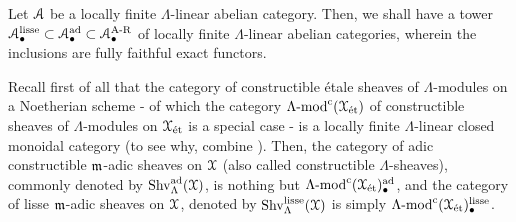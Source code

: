             \begin{proposition} \label{prop: adic_categories_are_linear_and_abelian}
                Let $\mathcal{A}$ be a locally finite $\Lambda$-linear abelian category. Then, we shall have a tower $\mathcal{A}_{\bullet}^{\mathrm{lisse}} \subset \mathcal{A}_{\bullet}^{\mathrm{ad}} \subset \mathcal{A}_{\bullet}^{\mathrm{A\text{-}R}}$ of locally finite $\Lambda$-linear abelian categories, wherein the inclusions are fully faithful exact functors.
            \end{proposition}
            \begin{example} \label{example: adic_sheaves}
                Recall first of all that the category of constructible \'etale sheaves of $\Lambda$-modules on a Noetherian scheme - of which the category $\Lambda\text{-}\mathrm{mod}^{\mathrm{c}}(\mathcal{X}_{\mathrm{\acute{e}t}})$ of constructible sheaves of $\Lambda$-modules on $\mathcal{X}_{\mathrm{\acute{e}t}}$ is a special case - is a locally finite $\Lambda$-linear closed monoidal category (to see why, combine \cite[Propositions 3.20 and 3.22]{behrend_l_adic_sheaves_for_algebraic_stacks}). Then, the category of adic constructible $\mathfrak{m}$-adic sheaves on $\mathcal{X}$ (also called constructible $\Lambda$-sheaves), commonly denoted by $\mathrm{Shv}_{\Lambda}^{\mathrm{ad}}(\mathcal{X})$, is nothing but $\Lambda\text{-}\mathrm{mod}^{\mathrm{c}}(\mathcal{X}_{\mathrm{\acute{e}t}})_{\bullet}^{\mathrm{ad}}$, and the category of lisse $\mathfrak{m}$-adic sheaves on $\mathcal{X}$, denoted by $\mathrm{Shv}_{\Lambda}^{\mathrm{lisse}}(\mathcal{X})$ is simply $\Lambda\text{-}\mathrm{mod}^{\mathrm{c}}(\mathcal{X}_{\mathrm{\acute{e}t}})_{\bullet}^{\mathrm{lisse}}$.
            \end{example}
            

